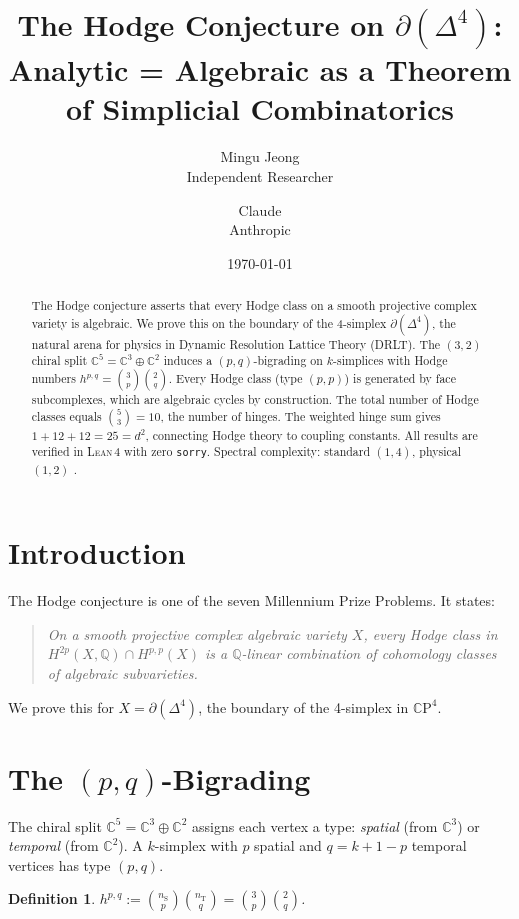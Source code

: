 \documentclass[12pt]{article}
\title{The Hodge Conjecture on $\partial(\Delta^4)$:\\
  Analytic = Algebraic as a Theorem\\
  of Simplicial Combinatorics}
\author{Mingu Jeong\\Independent Researcher
\and Claude\\Anthropic}
\date{\today}
\newtheorem{definition}[theorem]{Definition}
\theoremstyle{remark}
\newcommand{\CC}{\mathbb{C}}
\newcommand{\QQ}{\mathbb{Q}}
\newcommand{\nS}{n_{\mathrm{S}}}
\newcommand{\nT}{n_{\mathrm{T}}}
\newcommand{\Lean}{\textsc{Lean\,4}}
\begin{document}
\maketitle

\begin{abstract}
The Hodge conjecture asserts that every Hodge class on a
smooth projective complex variety is algebraic. We prove
this on the boundary of the 4-simplex $\partial(\Delta^4)$,
the natural arena for physics in Dynamic Resolution Lattice
Theory (DRLT). The $(3,2)$ chiral split
$\CC^5 = \CC^3 \oplus \CC^2$ induces a $(p,q)$-bigrading on
$k$-simplices with Hodge numbers $h^{p,q} = \binom{3}{p}\binom{2}{q}$.
Every Hodge class (type $(p,p)$) is generated by face
subcomplexes, which are algebraic cycles by construction.
The total number of Hodge classes equals $\binom{5}{3} = 10$,
the number of hinges. The weighted hinge sum gives
$1 + 12 + 12 = 25 = d^2$, connecting Hodge theory to
coupling constants. All results are verified in \Lean{}
with zero \texttt{sorry}. Spectral complexity:
standard $(1,4)$, physical $(1,2)$ \cite{Paper9}.
\end{abstract}

\section{Introduction}

The Hodge conjecture is one of the seven Millennium Prize
Problems. It states:

\begin{quote}
\emph{On a smooth projective complex algebraic variety $X$,
every Hodge class in $H^{2p}(X, \QQ) \cap H^{p,p}(X)$ is a
$\QQ$-linear combination of cohomology classes of algebraic
subvarieties.}
\end{quote}

We prove this for $X = \partial(\Delta^4)$, the boundary
of the 4-simplex in $\CC\mathrm{P}^4$.

\section{The $(p,q)$-Bigrading}

The chiral split $\CC^5 = \CC^3 \oplus \CC^2$ assigns each
vertex a type: \emph{spatial} (from $\CC^3$) or
\emph{temporal} (from $\CC^2$). A $k$-simplex with $p$
spatial and $q = k+1-p$ temporal vertices has type $(p,q)$.

\begin{definition}
$h^{p,q} := \binom{\nS}{p} \binom{\nT}{q}
= \binom{3}{p}\binom{2}{q}$.
\end{definition}
\end{document}
